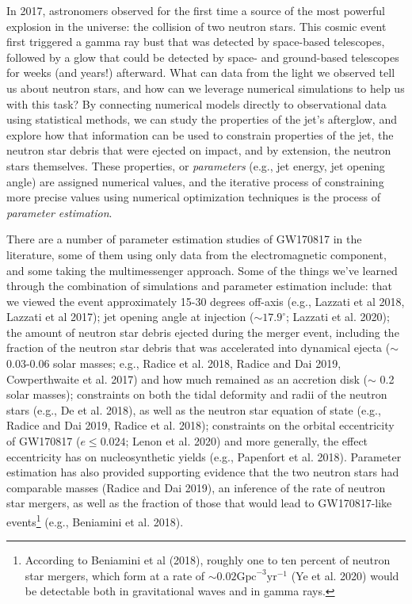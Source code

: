 \documentclass[1.5,11pt]{beavtex}
\begin{document}
In 2017, astronomers observed for the first time a source of the most powerful explosion in the universe: the collision of two neutron stars. This cosmic event first triggered a gamma ray bust that was detected by space-based telescopes, followed by a glow that could be detected by space- and ground-based telescopes for weeks (and years!) afterward. What can data from the light we observed tell us about neutron stars, and how can we leverage numerical simulations to help us with this task? By connecting numerical models directly to observational data using statistical methods, we can study the properties of the jet’s afterglow, and explore how that information can be used to constrain properties of the jet, the neutron star debris that were ejected on impact, and by extension, the neutron stars themselves. These properties, or \textit{parameters}  (e.g., jet energy, jet opening angle) are assigned numerical values, and the iterative process of constraining more precise values using numerical optimization techniques is the process of \textit{parameter estimation}. 

There are a number of parameter estimation studies of GW170817 in the literature, some of them using only data from the electromagnetic component, and some taking the multimessenger approach. Some of the things we've learned through the combination of simulations and parameter estimation include: that we viewed the event approximately 15-30 degrees off-axis (e.g., Lazzati et al 2018, Lazzati et al 2017); jet opening angle at injection ($\sim 17.9^{\circ}$; Lazzati et al. 2020); the amount of neutron star debris ejected during the merger event, including the fraction of the neutron star debris that was accelerated into dynamical ejecta ($\sim$ 0.03-0.06 solar masses; e.g., Radice et al. 2018, Radice and Dai 2019, Cowperthwaite et al. 2017) and how much remained as an accretion disk ($\sim$ 0.2 solar masses); constraints on both the tidal deformity and radii of the neutron stars (e.g., De et al. 2018), as well as the neutron star equation of state (e.g., Radice and Dai 2019, Radice et al. 2018); constraints on the orbital eccentricity of GW170817 ($e \leq 0.024$; Lenon et al. 2020) and more generally, the effect eccentricity has on nucleosynthetic yields (e.g., Papenfort et al. 2018). Parameter estimation has also provided supporting evidence that the two neutron stars had comparable masses (Radice and Dai 2019), an inference of the rate of neutron star mergers, as well as the fraction of those that would lead to GW170817-like events\footnote{\selectfont According to Beniamini et al (2018), roughly one to ten percent of neutron star mergers, which form at a rate of $\sim 0.02 \mathrm{Gpc}^{−3} \mathrm{yr}^{−1}$ (Ye et al. 2020) would be detectable both in gravitational waves and in gamma rays.} (e.g., Beniamini et al. 2018). 
\end{document}
